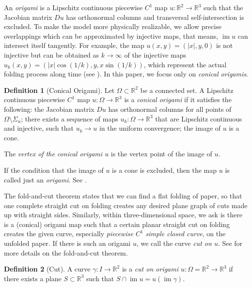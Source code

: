 \documentclass{amsart}
\theoremstyle{plain}
\theoremstyle{definition}
\newtheorem*{definition}{Definition}
\theoremstyle{remark}
\DeclareMathOperator{\im}{im}
\begin{document}
An \emph{origami} is a Lipschitz continuous piecewise $C^1$ map $u \colon \mathbb{R}^2\to\mathbb{R}^3$ such that the Jacobian matrix $Du$ has orthonormal columns 
and transversal self-intersection is excluded.
To make the model more physically realizable, we allow precise overlappings which can be approximated by injective maps, that means, 
$\im u$ can intersect itself tangently. 
For example, the map $u(x,y)=(|x|,y,0)$ is not injective but can be obtained as $k\to\infty$ of the injective maps $u_k(x,y)=(|x|\cos(1/k), y, x\sin(1/k))$, 
which represent the actual folding process along time (see \cite{dacorogna2008lipschitz}).
In this paper, we focus only on \emph{conical origamis}. 


\begin{definition}[Conical Origami]%
Let $\Omega\subset \mathbb{R}^2$ be a connected set.
A Lipschitz continuous piecewise $C^1$ map $u \colon \Omega\to\mathbb{R}^3$ is a \emph{conical origami} if it satisfies the following:
the Jacobian matrix $Du$ has orthonormal columns for all points of $\Omega\setminus\Sigma_u$;
there exists a sequence of maps $u_k \colon \Omega\to\mathbb{R}^3$ that are Lipschitz continuous and injective, such that $u_k\to u$ in the uniform convergence;
the image of $u$ is a cone.

The \emph{vertex of the conical origami $u$} is the vertex point of the image of $u$.
\end{definition}

If the condition that the image of $u$ is a cone is excluded, then the map $u$ is called just an \emph{origami}.
See \cite{dacorogna2008lipschitz}.

The fold-and-cut theorem states that we can find a flat folding of paper, so that one complete straight cut on folding creates any desired plane graph of cuts made up with straight sides.
Similarly, within three-dimensional space, we ask is there is a (conical) origami map such that a certain planar straight cut on folding creates the given curve, especially \emph{piecewise $C^1$ simple closed curve}, on the unfolded paper.
If there is such an origami $u$, we call the curve \emph{cut on $u$}.
See \cite{demaine2000folding} for more details on the fold-and-cut theorem. 


\begin{definition}[Cut]%
A curve $\gamma \colon I\to\mathbb{R}^2$ is a \emph{cut on origami $u \colon \Omega=\mathbb{R}^2\to\mathbb{R}^3$} if there exists a plane $S\subset\mathbb{R}^3$ such that $S\cap\im u=u(\im \gamma)$.
\end{definition}
\end{document}
